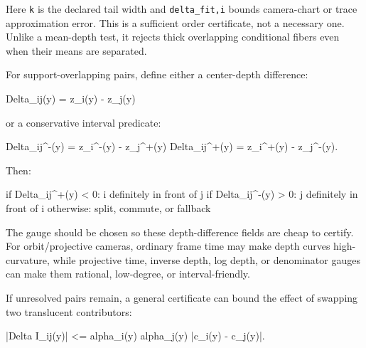 \documentclass[
]{article}
\newenvironment{Shaded}{}{}
\newcommand{\NormalTok}[1]{#1}
\begin{document}
Here \texttt{k} is the declared tail width and \texttt{delta\_fit,i}
bounds camera-chart or trace approximation error. This is a sufficient
order certificate, not a necessary one. Unlike a mean-depth test, it
rejects thick overlapping conditional fibers even when their means are
separated.

For support-overlapping pairs, define either a center-depth difference:

\begin{Shaded}
\begin{Highlighting}[]
\NormalTok{Delta\_ij(y) = z\_i(y) {-} z\_j(y)}
\end{Highlighting}
\end{Shaded}

or a conservative interval predicate:

\begin{Shaded}
\begin{Highlighting}[]
\NormalTok{Delta\_ij\^{}{-}(y) = z\_i\^{}{-}(y) {-} z\_j\^{}+(y)}
\NormalTok{Delta\_ij\^{}+(y) = z\_i\^{}+(y) {-} z\_j\^{}{-}(y).}
\end{Highlighting}
\end{Shaded}

Then:

\begin{Shaded}
\begin{Highlighting}[]
\NormalTok{if Delta\_ij\^{}+(y) \textless{} 0:  i definitely in front of j}
\NormalTok{if Delta\_ij\^{}{-}(y) \textgreater{} 0:  j definitely in front of i}
\NormalTok{otherwise:             split, commute, or fallback}
\end{Highlighting}
\end{Shaded}

The gauge should be chosen so these depth-difference fields are cheap to
certify. For orbit/projective cameras, ordinary frame time may make
depth curves high-curvature, while projective time, inverse depth, log
depth, or denominator gauges can make them rational, low-degree, or
interval-friendly.

If unresolved pairs remain, a general certificate can bound the effect
of swapping two translucent contributors:

\begin{Shaded}
\begin{Highlighting}[]
\NormalTok{|Delta I\_ij(y)| \textless{}= alpha\_i(y) alpha\_j(y) |c\_i(y) {-} c\_j(y)|.}
\end{Highlighting}
\end{Shaded}
\end{document}

